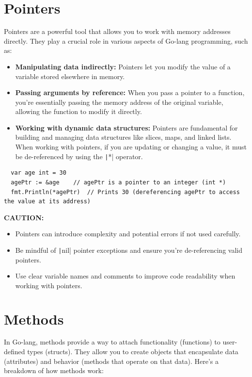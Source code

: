\documentclass[letterpaper,12pt]{article}
\begin{document}
\section{Pointers}
Pointers are a powerful tool that allows you to work with memory addresses directly. They play a crucial role in various aspects of Go-lang programming, such as:
\begin{itemize}
  \item \textbf{Manipulating data indirectly:} Pointers let you modify the value of a variable stored elsewhere in memory.
  \item \textbf{Passing arguments by reference:} When you pass a pointer to a function, you're essentially passing the memory address of the original variable, allowing the function to modify it directly.
  \item \textbf{Working with dynamic data structures:} Pointers are fundamental for building and managing data structures like slices, maps, and linked lists.
When working with pointers, if you are updating or changing a value, it must be de-referenced by using the \texttt|*| operator.
\end{itemize}
\begin{verbatim}
  var age int = 30
  agePtr := &age    // agePtr is a pointer to an integer (int *)
  fmt.Println(*agePtr)  // Prints 30 (dereferencing agePtr to access the value at its address)
\end{verbatim}
\textbf{CAUTION:}
\begin{itemize}
  \item Pointers can introduce complexity and potential errors if not used carefully.
  \item Be mindful of \texttt|nil| pointer exceptions and ensure you're de-referencing valid pointers.
  \item Use clear variable names and comments to improve code readability when working with pointers.
\end{itemize}

\section{Methods}
In Go-lang, methods provide a way to attach functionality (functions) to user-defined types (structs). They allow you to create objects that encapsulate data (attributes) and behavior (methods that operate on that data). Here's a breakdown of how methods work:
\newpage
\end{document}
